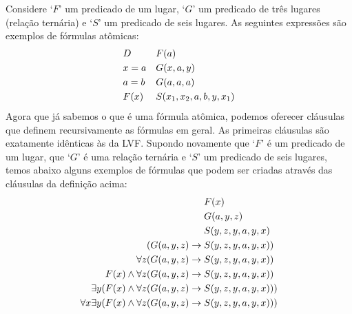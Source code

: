 Considere `$F$' um predicado de um lugar, `$G$' um predicado de três lugares (relação ternária) e `$S$' um predicado de seis lugares. As seguintes expressões são exemplos de fórmulas atômicas:
	\begin{align*}
		& D &&  \mathord{F}(a)\\
		& x = a && \mathord{G}(x,a,y)\\
		& a = b && \mathord{G}(a,a,a)\\
		& \mathord{F}(x) && \mathord{S}(x_1, x_2, a, b, y, x_1)\\
	\end{align*}
Agora que já sabemos o que é uma fórmula atômica, podemos oferecer cláusulas que definem recursivamente as fórmulas em geral.
As primeiras cláusulas são exatamente idênticas às da LVF.
Supondo novamente que `$F$' é um predicado de um lugar, que `$G$' é uma relação ternária e `$S$' um predicado de seis lugares, temos abaixo alguns exemplos de fórmulas que podem ser criadas através das cláusulas da definição acima:
	\begin{align*}
		& \mathord{F}(x)\\
		& \mathord{G}(a,y,z)\\
		& \mathord{S}(y,z,y,a,y,x)\\
		(\mathord{G}(a,y,z) \rightarrow {}& \mathord{S}(y,z,y,a,y,x))\\
		\forall z (\mathord{G}(a,y,z) \rightarrow {}& \mathord{S}(y,z,y,a,y,x))\\
		\mathord{F}(x) \wedge \forall z (\mathord{G}(a,y,z) \rightarrow {}& \mathord{S}(y,z,y,a,y,x))\\
		\exists y (\mathord{F}(x) \wedge \forall z (\mathord{G}(a,y,z) \rightarrow {}& \mathord{S}(y,z,y,a,y,x)))\\
		\forall x \exists y (\mathord{F}(x) \wedge \forall z (\mathord{G}(a,y,z) \rightarrow {}& \mathord{S}(y,z,y,a,y,x)))
	\end{align*}
